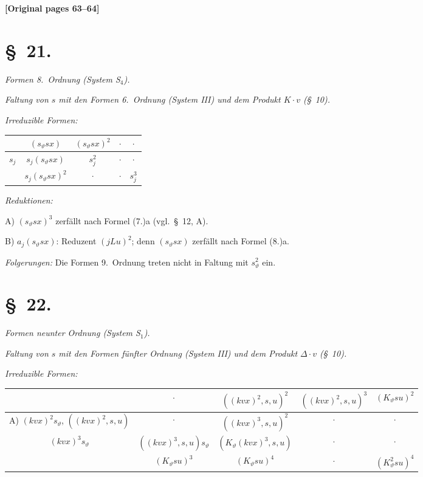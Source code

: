 \documentclass[12pt,a4paper]{article}
\begin{document}
\noindent\textbf{[Original pages 63--64]}

\section*{\S\ 21.}

\textit{Formen 8.\ Ordnung (System S$_4$).}

\textit{Faltung von $s$ mit den Formen 6.\ Ordnung (System III) und dem Produkt $K \cdot v$ (\S\ 10).}

\textit{Irreduzible Formen:}
\begin{center}
\begin{tabular}{c|cccc}
& $(s_\vartheta sx)$ & $(s_\vartheta sx)^2$ & $\cdot$ & $\cdot$ \\
\hline
$s_j$ & $s_j(s_\vartheta sx)$ & $s_j^2$ & $\cdot$ & $\cdot$ \\
& $s_j(s_\vartheta sx)^2$ & $\cdot$ & $\cdot$ & $s_j^3$
\end{tabular}
\end{center}

\textit{Reduktionen:}

A) $(s_\vartheta sx)^3$ zerfällt nach Formel (7.)a (vgl.\ \S\ 12, A).

B) $a_j(s_\vartheta sx)$: Reduzent $(jLu)^2$; denn $(s_\vartheta sx)$ zerfällt nach Formel (8.)a.

\textit{Folgerungen:} Die Formen 9.\ Ordnung treten nicht in Faltung mit $s_\vartheta^2$ ein.

\section*{\S\ 22.}

\textit{Formen neunter Ordnung (System S$_1$).}

\textit{Faltung von $s$ mit den Formen fünfter Ordnung (System III) und dem Produkt $\varDelta \cdot v$ (\S\ 10).}

\textit{Irreduzible Formen:}
\begin{center}
\begin{tabular}{c|c|c|c|c}
& $\cdot$ & $((kvx)^2, s, u)^2$ & $((kvx)^2, s, u)^3$ & $(K_\vartheta su)^2$ \\
\hline
A) $(kvx)^2 s_\vartheta$, $((kvx)^2, s, u)$ & $\cdot$ & $((kvx)^3, s, u)^2$ & $\cdot$ & $\cdot$ \\
$(kvx)^3 s_\vartheta$ & $((kvx)^3, s, u)s_\vartheta$ & $(K_\vartheta (kvx)^3, s, u)$ & $\cdot$ & $\cdot$ \\
& $(K_\vartheta su)^3$ & $(K_\vartheta su)^4$ & $\cdot$ & $(K_\vartheta^2 su)^4$
\end{tabular}
\end{center}
\end{document}
